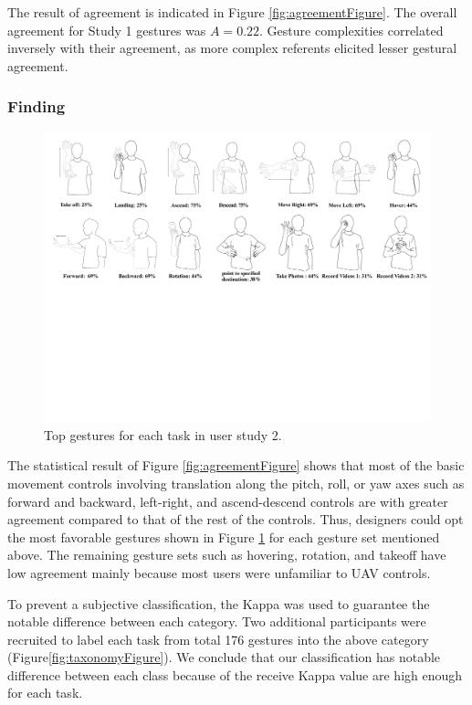 \documentclass{sigchi}
\begin{document}
The result of agreement is indicated in Figure \ref{fig:agreementFigure}. The overall agreement for Study 1 gestures was $A=0.22$. Gesture complexities correlated inversely with their agreement, as more complex referents elicited lesser gestural agreement.

\subsubsection{Finding}

\begin{figure}
  \centering
  \includegraphics[width=1\textwidth]{GestureSetFigure1.pdf}
  \caption{Top gestures for each task in user study 2.}
  \label{fig:GestureSetFigure}
  \end{figure}

The statistical result of Figure \ref{fig:agreementFigure} shows that most of the basic movement controls involving translation along the pitch, roll, or yaw axes such as forward and backward, left-right, and ascend-descend controls are with greater agreement compared to that of the rest of the controls. Thus, designers could opt the most favorable gestures shown in Figure \ref{fig:GestureSetFigure} for each gesture set mentioned above. The remaining gesture sets such as hovering, rotation, and takeoff have low agreement mainly because most users were unfamiliar to UAV controls.

To prevent a subjective classification, the Kappa was used to guarantee the notable difference between each category. Two additional participants were recruited to label each task from total 176 gestures into the above category (Figure\ref{fig:taxonomyFigure}). We conclude that our classification has notable difference between each class because of the receive Kappa value are high enough for each task.
\end{document}
